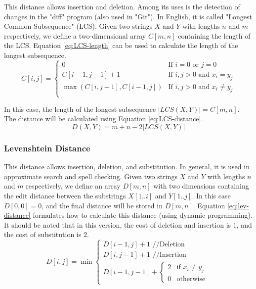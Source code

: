\documentclass{KBook}
\begin{document}
This distance allows insertion and deletion. Among its uses is the detection of changes in the "diff" program (also used in "Git"). In English, it is called "Longest Common Subsequence" (LCS). Given two strings $X$ and $Y$ with lengths $n$ and $m$ respectively, we define a two-dimensional array $C[m, n]$ containing the length of the LCS. Equation \ref{eq:LCS-length} can be used to calculate the length of the longest subsequence.
\begin{equation}
	C[i, j] =  
	\begin{cases}
		0 & \text{If } i = 0 \text{ or } j=0\\
		C[i-1, j-1] + 1 & \text{If } i,j > 0 \text{ and } x_i = y_j\\
		\max (C[i, j-1], C[i-1, j]) & \text{If } i,j > 0 \text{ and } x_i \ne y_j\\
	\end{cases}
	\label{eq:LCS-length}
\end{equation}

In this case, the length of the longest subsequence $|LCS(X, Y)| = C[m, n]$. The distance will be calculated using Equation \ref{eq:LCS-distance}.
\begin{equation}
	D(X, Y) = m + n - 2 |LCS(X, Y)|
	\label{eq:LCS-distance}
\end{equation}

\subsubsection{Levenshtein Distance}

This distance allows insertion, deletion, and substitution. In general, it is used in approximate search and spell checking. Given two strings $X$ and $Y$ with lengths $n$ and $m$ respectively, we define an array $D[m, n]$ with two dimensions containing the edit distance between the substrings $X[1..i]$ and $Y[1..j]$. In this case $D[0, 0] = 0$, and the final distance will be stored in $D[m, n]$. Equation \ref{eq:lev-distance} formulates how to calculate this distance (using dynamic programming). It should be noted that in this version, the cost of deletion and insertion is $1$, and the cost of substitution is $2$.
\begin{equation}
	D[i, j] = \min 
	\begin{cases}
		D[i - 1, j] + 1 \text{ //Deletion}\\
		D[i, j-1] + 1 \text{ //Insertion}\\
		D[i-1, j-1] + \begin{cases}
			2 & \text{if } x_i \ne y_j \\
			0 & \text{otherwise}
		\end{cases}
	\end{cases}
	\label{eq:lev-distance}
\end{equation}
\end{document}

